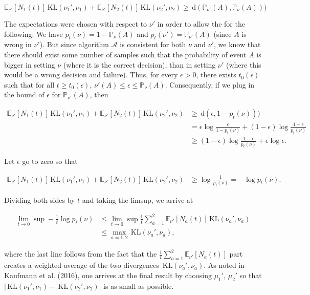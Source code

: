 \documentclass[12pt,]{article}
\newcommand{\KL}{\,\text{KL}}
\newcommand{\der}{\,\text{d}}
\begin{document}
\begin{equation*}
\mathbb{E}_{\nu'}[N_1(t)]\KL(\nu_1', \nu_1) + \mathbb{E}_{\nu'}[N_2(t)]\KL(\nu_2', \nu_2) \geq \der(\mathbb{P}_{\nu'}(A),\mathbb{P}_{\nu}(A)))
\end{equation*}

The expectations were chosen with respect to \(\nu'\) in order to allow
the for the following: We have \(p_t(\nu) = 1 - \mathbb{P}_{\nu}(A)\)
and \(p_t(\nu') = \mathbb{P}_{\nu'}(A)\) (since \(A\) is wrong in
\(\nu'\)). But since algorithm \(\mathcal{A}\) is consistent for both
\(\nu\) and \(\nu'\), we know that there should exist some number of
samples such that the probability of event \(A\) is bigger in setting
\(\nu\) (where it is the correct decision), than in setting \(\nu'\)
(where this would be a wrong decision and failure). Thus, for every
\(\epsilon > 0\), there exists \(t_0(\epsilon)\) such that for all
\(t \geq t_0(\epsilon)\),
\(\mathbb{\nu'}(A) \leq \epsilon \leq \mathbb{P}_\nu(A)\). Consequently,
if we plug in the bound of \(\epsilon\) for \(\mathbb{P}_{\nu'}(A)\),
then

\begin{align*}
\mathbb{E}_{\nu'}[N_1(t)]\KL(\nu_1', \nu_1) + \mathbb{E}_{\nu'}[N_2(t)]\KL(\nu_2', \nu_2) & \geq \der(\epsilon,1-p_t(\nu))) \\
& = \epsilon \log \frac{\epsilon}{1-p_t(\nu)} + (1-\epsilon) \log \frac{1-\epsilon}{p_t(\nu)} \\
& \geq (1-\epsilon) \log \frac{1-\epsilon}{p_t(\nu)} + \epsilon \log \epsilon.
\end{align*}

Let \(\epsilon\) go to zero so that

\begin{align*}
\mathbb{E}_{\nu'}[N_1(t)]\KL(\nu_1', \nu_1) + \mathbb{E}_{\nu'}[N_2(t)]\KL(\nu_2', \nu_2)
& \geq \log \frac{1}{p_t(\nu)} = -\log p_t(\nu).
\end{align*}

Dividing both sides by \(t\) and taking the limsup, we arrive at

\begin{align*}
\lim_{t \to 0} \sup - \frac{1}{t} \log p_t(\nu)
& \leq \lim_{t \to 0} \sup \frac{1}{t} \sum_{a=1}^2 \mathbb{E}_{\nu'}[N_a(t)] \KL(\nu_a', \nu_a) \\
& \leq \max_{a=1,2} \KL(\nu_a', \nu_a),
\end{align*}

where the last line follows from the fact that the
\(\frac{1}{t} \sum_{a=1}^2 \mathbb{E}_{\nu'}[N_a(t)]\) part creates a
weighted average of the two divergences \(\KL(\nu_a', \nu_a)\). As noted
in Kaufmann et al. (2016), one arrives at the final result by choosing
\(\mu_1'\), \(\mu_2'\) so that
\(| \KL(\nu_1', \nu_1) - \KL(\nu_2', \nu_2) |\) is as small as possible.
\end{document}
